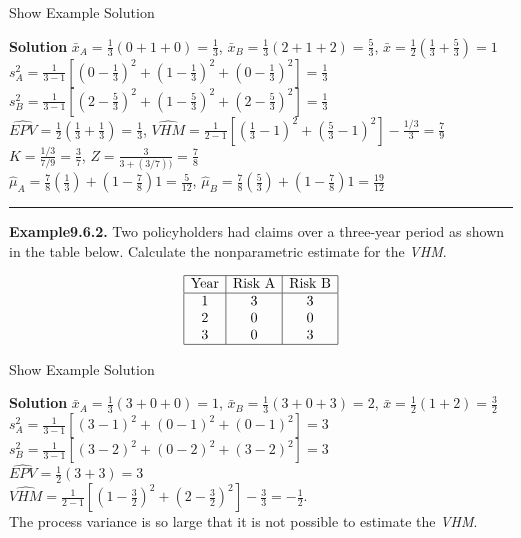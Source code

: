 \documentclass[]{book}
\theoremstyle{definition}
\theoremstyle{definition}
\theoremstyle{definition}
\theoremstyle{remark}
\begin{document}
Show Example Solution

\hypertarget{toggleExampleCred.6.1}{}
\textbf{Solution} \(\bar{x}_A=\frac{1}{3}(0+1+0)=\frac{1}{3}\),
\(\bar{x}_B=\frac{1}{3}(2+1+2)=\frac{5}{3}\),
\(\bar{x}=\frac{1}{2}(\frac{1}{3}+\frac{5}{3})=1\)\\
\(s_A^2=\frac{1}{3-1}\left[(0-\frac{1}{3})^2+(1-\frac{1}{3})^2+(0-\frac{1}{3})^2\right]=\frac{1}{3}\)\\
\(s_B^2=\frac{1}{3-1}\left[(2-\frac{5}{3})^2+(1-\frac{5}{3})^2+(2-\frac{5}{3})^2\right]=\frac{1}{3}\)\\
\(\widehat{EPV}=\frac{1}{2}\left(\frac{1}{3}+\frac{1}{3}\right)=\frac{1}{3}\),
\(\widehat{VHM}=\frac{1}{2-1}\left[(\frac{1}{3}-1)^2+(\frac{5}{3}-1)^2\right]-\frac{1/3}{3}=\frac{7}{9}\)\\
\(K=\frac{1/3}{7/9}=\frac{3}{7}\),
\(Z=\frac{3}{3+(3/7))}=\frac{7}{8}\)\\
\(\hat{\mu}_A=\frac{7}{8}\left(\frac{1}{3}\right)+(1-\frac{7}{8})1=\frac{5}{12}\),
\(\hat{\mu}_B=\frac{7}{8}\left(\frac{5}{3}\right)+(1-\frac{7}{8})1=\frac{19}{12}\)

\begin{center}\rule{0.5\linewidth}{\linethickness}\end{center}

\textbf{Example9.6.2.} Two policyholders had claims over a three-year
period as shown in the table below. Calculate the nonparametric estimate
for the \emph{VHM}.

\[\begin{matrix}
\begin{array}{|c|c|c|}
\hline
\text{Year} & \text{Risk A} & \text{Risk B} \\
\hline
1 & 3 &  3 \\
2 & 0 &  0  \\  
3 & 0 &  3  \\              
\hline
\end{array}
\end{matrix}\]

Show Example Solution

\hypertarget{toggleExampleCred.6.2}{}
\textbf{Solution} \(\bar{x}_A=\frac{1}{3}(3+0+0)=1\),
\(\bar{x}_B=\frac{1}{3}(3+0+3)=2\),
\(\bar{x}=\frac{1}{2}(1+2)=\frac{3}{2}\)\\
\(s_A^2=\frac{1}{3-1}\left[(3-1)^2+(0-1)^2+(0-1)^2\right]=3\)\\
\(s_B^2=\frac{1}{3-1}\left[(3-2)^2+(0-2)^2+(3-2)^2\right]=3\)\\
\(\widehat{EPV}=\frac{1}{2}(3+3)=3\)\\
\(\widehat{VHM}=\frac{1}{2-1}\left[(1-\frac{3}{2})^2+(2-\frac{3}{2})^2\right]-\frac{3}{3}=-\frac{1}{2}.\)\\
The process variance is so large that it is not possible to estimate the
\emph{VHM}.
\end{document}
